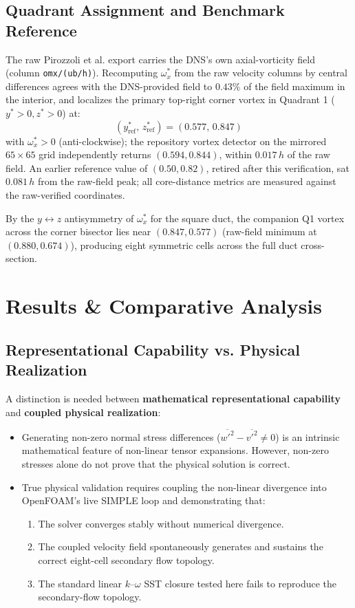 \documentclass[11pt,a4paper]{article}
\begin{document}
\subsection{Quadrant Assignment and Benchmark Reference}
The raw Pirozzoli et al. \cite{pirozzoli2018turbulence} export carries the DNS's own axial-vorticity field (column \texttt{omx/(ub/h)}). Recomputing $\omega_x^*$ from the raw velocity columns by central differences agrees with the DNS-provided field to $0.43\%$ of the field maximum in the interior, and localizes the primary top-right corner vortex in Quadrant 1 ($y^* > 0, z^* > 0$) at:
\begin{equation}
(y_{\text{ref}}^*, \, z_{\text{ref}}^*) = (0.577, \, 0.847)
\end{equation}
with $\omega_x^* > 0$ (anti-clockwise); the repository vortex detector on the mirrored $65 \times 65$ grid independently returns $(0.594, 0.844)$, within $0.017\,h$ of the raw field. An earlier reference value of $(0.50, 0.82)$, retired after this verification, sat $0.081\,h$ from the raw-field peak; all core-distance metrics are measured against the raw-verified coordinates.

By the $y \leftrightarrow z$ antisymmetry of $\omega_x^*$ for the square duct, the companion Q1 vortex across the corner bisector lies near $(0.847, 0.577)$ (raw-field minimum at $(0.880, 0.674)$), producing eight symmetric cells across the full duct cross-section.

\section{Results \& Comparative Analysis}

\subsection{Representational Capability vs. Physical Realization}
A distinction is needed between \textbf{mathematical representational capability} and \textbf{coupled physical realization}:
\begin{itemize}
    \item Generating non-zero normal stress differences ($\overline{{w'}^2} - \overline{{v'}^2} \ne 0$) is an intrinsic mathematical feature of non-linear tensor expansions. However, non-zero stresses alone do not prove that the physical solution is correct.
    \item True physical validation requires coupling the non-linear divergence into OpenFOAM's live SIMPLE loop and demonstrating that:
    \begin{enumerate}
        \item The solver converges stably without numerical divergence.
        \item The coupled velocity field spontaneously generates and sustains the correct eight-cell secondary flow topology.
        \item The standard linear $k\text{--}\omega$ SST closure tested here fails to reproduce the secondary-flow topology.
    \end{enumerate}
\end{itemize}
\end{document}
